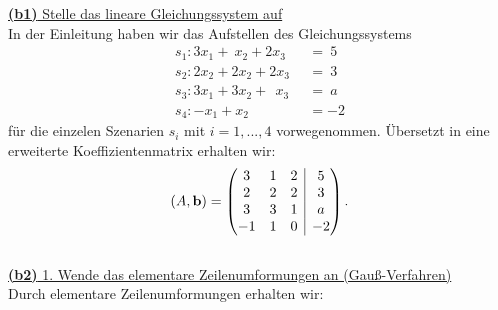 \underline{\textbf{(b1)} Stelle das lineare Gleichungssystem auf}\\
In der Einleitung haben wir das Aufstellen des Gleichungssystems
\begin{align*}
	s_1 : 3x_1 +  \ x_2 + 2 x_3 \ &=\ 5\\
	s_2 : 2x_2 + 2 x_2 + 2 x_3 \ &= \ 3\\
	s_3 : 3x_1 + 3x_2 + \ \ x_3 \ &= \ a \ \\
	s_4 : -x_1 + x_2 \qquad \quad \ \ &= -2
\end{align*}
für die einzelen Szenarien $s_i$ mit $i = 1,...,4$ vorwegenommen.
Übersetzt in eine erweiterte Koeffizientenmatrix erhalten wir:
\begin{align*}
	(A,\mathbf{b})
	=
	\begin{pmatrix}
		3 & 1 & 2 & \BAR & 5\\
		2 & 2 & 2 & \BAR & 3\\
		3 & 3 & 1 & \BAR & a \\
		-1 & 1 & 0 & \BAR & -2
	\end{pmatrix}.
\end{align*}
\ \\
\underline{\textbf{(b2)} 1. Wende das elementare Zeilenumformungen an (Gauß-Verfahren)}\\
Durch elementare Zeilenumformungen erhalten wir:
